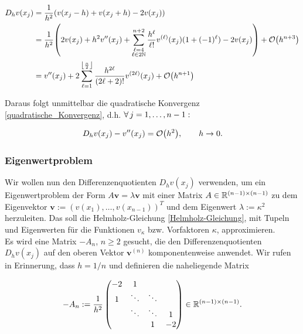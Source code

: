 \begin{align*}
  D_h v(x_j)
  & = \frac{1}{h^2} {\left ( 
    v(x_j - h) + v(x_j + h) - 2 v(x_j)
   \right )} \\
  & = \frac{1}{h^2} {\left ( 
        2 v(x_j) +
        h^2 v^{\prime \prime}(x_j) +
        \sum_{\substack{\ell = 4 \\ \ell \in 2 \mathbb{N}}}^{n+2}
        \frac{h^\ell}{\ell !}
        v^{(\ell)}(x_j)
        (1 + (-1)^\ell) -
        2 v(x_j)
       \right )} +
      \mathcal{O} {\left ( h^{n+3} \right )} \\
  & = v^{\prime \prime}(x_j) +
      2 \sum_{\ell = 1}^{\left \lfloor \frac{n}{2} \right \rfloor}
      \frac{h^{2 \ell}}{(2 \ell + 2)!}
      v^{(2 \ell)}(x_j) +
      \mathcal{O} {\left ( h^{n+1} \right )}
\end{align*}

Daraus folgt unmittelbar die quadratische Konvergenz \eqref{quadratische_Konvergenz}, d.h. $\forall \, j = 1, \ldots, n-1:$

\begin{align*}
  D_h v(x_j) - v^{\prime \prime}(x_j) = \mathcal{O} {\left ( h^2 \right )}, \qquad
  h \to 0.
\end{align*}

\subsubsection{Eigenwertproblem}

Wir wollen nun den Differenzenquotienten $D_h v(x_j)$ verwenden, um ein Eigenwertproblem der Form $A \mathbf{v} = \lambda \mathbf{v}$ mit einer Matrix $A \in \mathbb{R}^{(n-1) \times (n-1)}$ zu dem Eigenvektor $\mathbf{v} := (v(x_1), \ldots, v(x_{n-1}))^T$ und dem Eigenwert $\lambda := \kappa^2$ herzuleiten. Das soll die Helmholz-Gleichung \eqref{Helmholz-Gleichung}, mit Tupeln und Eigenwerten für die Funktionen $v_\kappa$ bzw. Vorfaktoren $\kappa$, approximieren. \\

Es wird eine Matrix $-A_n$, $n \geq 2$ gesucht, die den Differenzenquotienten $D_h v(x_j)$ auf den oberen Vektor $\mathbf{v}^{(n)}$ komponentenweise anwendet. Wir rufen in Erinnerung, dass $h = 1/n$ und definieren die naheliegende Matrix

\begin{align*}
  -A_n :=
  \frac{1}{h^2}
  \begin{pmatrix}
    -2 &  1      &        &    \\
     1 &  \ddots & \ddots &    \\
       &  \ddots & \ddots &  1 \\
       &         & 1      & -2
  \end{pmatrix}
  \in \mathbb{R}^{(n-1) \times (n-1)}.
\end{align*}

